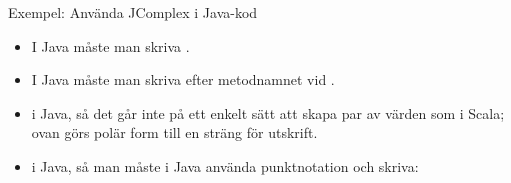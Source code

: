 \begin{Slide}{Exempel: Använda JComplex i Java-kod}\SlideFontSmall
{}
\begin{itemize}
\item I Java måste man skriva .  
\item I Java måste man skriva  efter metodnamnet vid .

\item {} i Java, så det går inte på ett enkelt sätt att skapa par av värden som i Scala; ovan görs polär form till en sträng för utskrift.

\item {} i Java, så man måste i Java använda punktnotation och skriva: 
\end{itemize}
\end{Slide}
  
  
  







